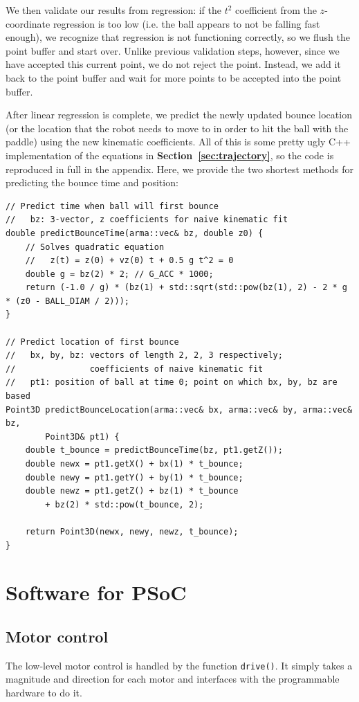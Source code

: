 \documentclass[letterpaper, 11pt]{article}
\newcommand*{\secref}[1]{\textbf{Section~\ref{#1}}}
\begin{document}
\begin{enumerate}[label=\textbf{\arabic*.}]
We then validate our results from regression: if the $t^2$ coefficient from the $z$-coordinate regression is too low (i.e. the ball appears to not be falling fast enough), we recognize that regression is not functioning correctly, so we flush the point buffer and start over. Unlike previous validation steps, however, since we have accepted this current point, we do not reject the point. Instead, we add it back to the point buffer and wait for more points to be accepted into the point buffer.

After linear regression is complete, we predict the newly updated bounce location (or the location that the robot needs to move to in order to hit the ball with the paddle) using the new kinematic coefficients. All of this is some pretty ugly C++ implementation of the equations in \secref{sec:trajectory}, so the code is reproduced in full in the appendix. Here, we provide the two shortest methods for predicting the bounce time and position:
\begin{verbatim}
// Predict time when ball will first bounce
//   bz: 3-vector, z coefficients for naive kinematic fit
double predictBounceTime(arma::vec& bz, double z0) {
    // Solves quadratic equation
    //   z(t) = z(0) + vz(0) t + 0.5 g t^2 = 0
    double g = bz(2) * 2; // G_ACC * 1000;
    return (-1.0 / g) * (bz(1) + std::sqrt(std::pow(bz(1), 2) - 2 * g * (z0 - BALL_DIAM / 2)));
}

// Predict location of first bounce
//   bx, by, bz: vectors of length 2, 2, 3 respectively;
//               coefficients of naive kinematic fit
//   pt1: position of ball at time 0; point on which bx, by, bz are based
Point3D predictBounceLocation(arma::vec& bx, arma::vec& by, arma::vec& bz,
        Point3D& pt1) {
    double t_bounce = predictBounceTime(bz, pt1.getZ());
    double newx = pt1.getX() + bx(1) * t_bounce;
    double newy = pt1.getY() + by(1) * t_bounce;
    double newz = pt1.getZ() + bz(1) * t_bounce
        + bz(2) * std::pow(t_bounce, 2);

    return Point3D(newx, newy, newz, t_bounce);
}
\end{verbatim}


\section{Software for PSoC}

\subsection{Motor control}
The low-level motor control is handled by the function \verb|drive()|. It simply takes a magnitude and direction for each motor and interfaces with the programmable hardware to do it.


\end{enumerate}
\end{document}

